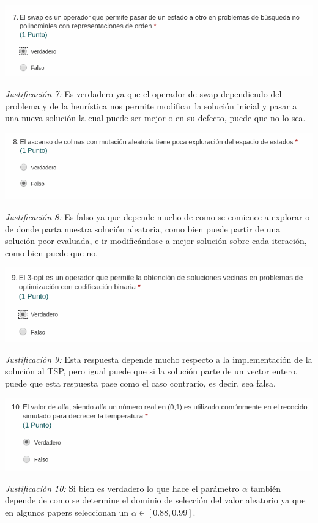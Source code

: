 \documentclass[10pt]{article}
\begin{document}
\begin{center}
  \includegraphics[scale=0.5]{img/p7.png}
\end{center}
\textit{Justificación 7: }Es verdadero ya que el operador de swap dependiendo del problema y de la heurística nos permite modificar la solución inicial y pasar a una nueva solución la cual puede ser mejor o en su defecto, puede que no lo sea.\\

\begin{center}
  \includegraphics[scale=0.5]{img/p8.png}
\end{center}
\textit{Justificación 8: }Es falso ya que depende mucho de como se comience a explorar o de donde parta nuestra solución aleatoria, como bien puede partir de una solución peor evaluada, e ir modificándose a mejor solución sobre cada iteración, como bien puede que no.\\

\begin{center}
  \includegraphics[scale=0.5]{img/p9.png}
\end{center}
\textit{Justificación 9: }Esta respuesta depende mucho respecto a la implementación de la solución al TSP, pero igual puede que si la solución parte de un vector entero, puede que esta respuesta pase como el caso contrario, es decir, sea falsa.\\

\begin{center}
  \includegraphics[scale=0.5]{img/p10.png}
\end{center}
\textit{Justificación 10: }Si bien es verdadero lo que hace el parámetro $\alpha$ también depende de como se determine el dominio de selección del valor aleatorio ya que en algunos papers seleccionan un $\alpha\in[0.88,0.99]$.
\end{document}
